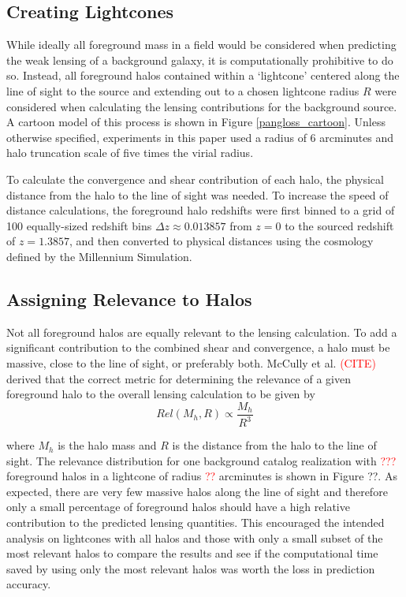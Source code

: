 \documentclass[%
 reprint,
 amsmath,amssymb,
 aps,nofootinbib
]{revtex4-1}
\begin{document}
\subsection{Creating Lightcones}

While ideally all foreground mass in a field would be considered when predicting the weak lensing of a background galaxy, it is computationally prohibitive to do so. Instead, all foreground halos contained within a `lightcone' centered along the line of sight to the source and extending out to a chosen lightcone radius $R$ were considered when calculating the lensing contributions for the background source. A cartoon model of this process is shown in Figure \ref{pangloss_cartoon}. Unless otherwise specified, experiments in this paper used a radius of 6 arcminutes and halo truncation scale of five times the virial radius.

To calculate the convergence and shear contribution of each halo, the physical distance from the halo to the line of sight was needed. To increase the speed of distance calculations, the foreground halo redshifts were first binned to a grid of 100 equally-sized redshift bins $\Delta z\approx0.013857$ from $z=0$ to the sourced redshift of $z=1.3857$, and then converted to physical distances using the cosmology defined by the Millennium Simulation.

\subsection{Assigning Relevance to Halos}

Not all foreground halos are equally relevant to the lensing calculation. To add a significant contribution to the combined shear and convergence, a halo must be massive, close to the line of sight, or preferably both. McCully et al. \textcolor{red}{(CITE)} derived that the correct metric for determining the relevance of a given foreground halo to the overall lensing calculation to be given by
\begin{equation}\label{relevant}
Rel(M_h,R)\propto\frac{M_h}{R^3}
\end{equation}

where $M_h$ is the halo mass and $R$ is the distance from the halo to the line of sight. The relevance distribution for one background catalog realization with \textcolor{red}{???} foreground halos in a lightcone of radius \textcolor{red}{??} arcminutes is shown in Figure ??. As expected, there are very few massive halos along the line of sight and therefore only a small percentage of foreground halos should have a high relative contribution to the predicted lensing quantities. This encouraged the intended analysis on lightcones with all halos and those with only a small subset of the most relevant halos to compare the results and see if the computational time saved by using only the most relevant halos was worth the loss in prediction accuracy.
\end{document}
